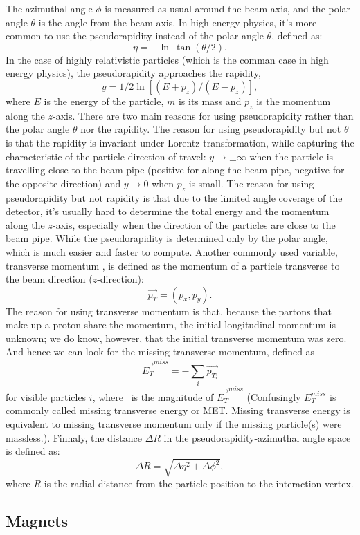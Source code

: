 The azimuthal angle $\phi$ 	is measured as usual around the beam axis, 
and the polar angle $\theta$ is the angle from the beam axis.  
In high energy physics, it's more common to use the 
pseudorapidity instead of the polar angle $\theta$, defined as:
\[
		\eta = -\ln\ \tan(\theta/2). 
\]
In the case of highly relativistic particles
(which is the comman case in high energy physics), 
the pseudorapidity approaches the rapidity, 
\[ 
	y=1/2\ln[(E+p_z)/(E-p_z)], 
\]
where $E$ is the energy of the particle, $m$ is its mass 
and $p_z$ is the momentum along the $z$-axis.
There are two main reasons for using pseudorapidity 
rather than the polar angle $\theta$ nor the rapidity.
The reason for using pseudorapidity but not $\theta$ 
is that the rapidity is invariant
under Lorentz transformation, while capturing 
the characteristic of the particle direction of travel:
$y \rightarrow \pm \infty $ when the particle is  
travelling close to the beam pipe (positive for along the
beam pipe, negative for the opposite direction) and
$y \rightarrow 0$ when $p_z$ is small.
The reason for using pseudorapidity but not rapidity
is that due to the limited angle coverage of the detector, 
it's usually hard to determine the total energy and the momentum 
along the $z$-axis, especially when the direction of 
the particles are close to the beam pipe. 
While the pseudorapidity is determined only by
the polar angle, which is much easier and faster 
to compute. 
Another commonly used variable, transverse momentum \pt, 
is defined as the momentum of a particle transverse to the 
beam direction ($z$-direction):
\[ 
	\vec{p_T}= (p_x,p_y).
\]
The reason for using transverse momentum 
is that, because the partons that make up a proton share the momentum,
the initial longitudinal momentum is unknown;	
we do know, however, that the initial transverse momentum was zero. 
And hence we can look for the missing transverse momentum, defined
as 
\[ 
	\vec{E_T}^{miss}=-\sum_i \vec{p_{T_i}} \label{eq:MET}
\]
for visible particles $i$, where \met\ is the magnitude of $\vec{E_T}^{miss}$
 (Confusingly $E_T^{miss}$ is commonly called 
missing transverse energy or MET. Missing transverse energy is equivalent 
to missing transverse momentum only if the missing particle(s) were massless.). 
Finnaly, the distance $\Delta R$ in the pseudorapidity-azimuthal angle 
space is defined as:
\[\Delta R = \sqrt{\Delta \eta^2+\Delta\phi^2},\]
where $R$ is the radial distance from the particle position to the interaction 
vertex.

\subsection{Magnets}


